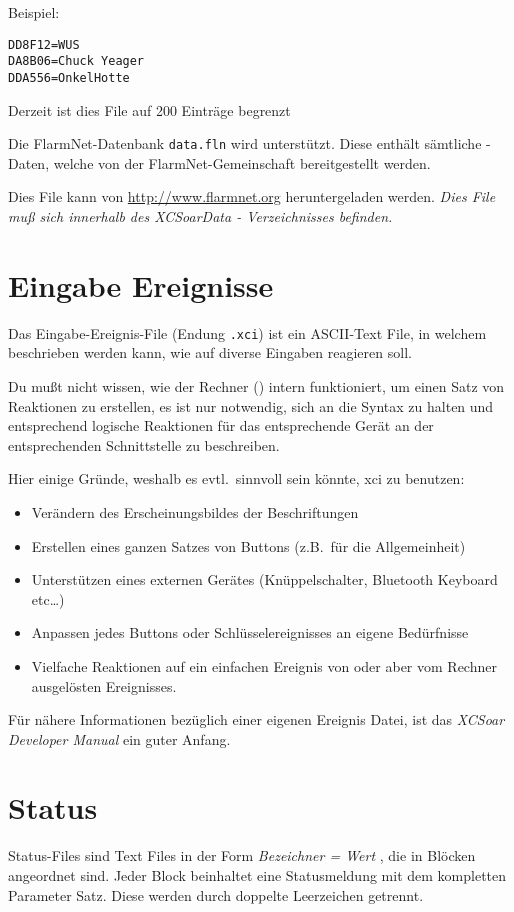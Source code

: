 Beispiel:
\begin{verbatim}
DD8F12=WUS
DA8B06=Chuck Yeager
DDA556=OnkelHotte
\end{verbatim}

Derzeit ist dies File auf 200 Einträge begrenzt

Die  FlarmNet-Datenbank \verb|data.fln| wird unterstützt.
Diese enthält sämtliche \fl-Daten, welche von der \textsf{\textsf{FlarmNet}}-Gemeinschaft bereitgestellt werden.

Dies File kann von  \url{http://www.flarmnet.org}  heruntergeladen werden.
\textsl{Dies File muß sich innerhalb des XCSoarData - Verzeichnisses befinden.}


\section{Eingabe Ereignisse}

Das Eingabe-Ereignis-File  (Endung \verb|.xci|) ist ein ASCII-Text File,
in welchem beschrieben werden kann, wie  \xc auf diverse Eingaben reagieren soll.

Du mußt nicht wissen, wie der Rechner (\xc) intern funktioniert, um einen Satz von
Reaktionen zu erstellen, es ist nur notwendig, sich an die Syntax zu halten und entsprechend logische
Reaktionen für das entsprechende Gerät an der entsprechenden Schnittstelle zu beschreiben.

Hier einige Gründe, weshalb es evtl.\ sinnvoll sein könnte, \textsf{xci} zu benutzen:
\begin{itemize}
\item Verändern des Erscheinungsbildes der   Beschriftungen
\item Erstellen eines ganzen Satzes von Buttons (z.B.\ für die Allgemeinheit)
\item Unterstützen eines externen Gerätes (Knüppelschalter, Bluetooth Keyboard etc\dots)
\item Anpassen jedes Buttons oder Schlüsselereignisses an eigene Bedürfnisse
\item Vielfache Reaktionen auf ein einfachen Ereignis von  \xc oder aber vom Rechner
ausgelösten Ereignisses.
\end{itemize}
Für nähere Informationen bezüglich einer eigenen Ereignis Datei, ist das 
{\em XCSoar Developer Manual} ein guter Anfang.


\section{Status}\label{sec:status}
Status-Files sind Text Files in der Form  {\em Bezeichner  = Wert },
die in Blöcken  angeordnet sind. Jeder Block beinhaltet eine Statusmeldung
mit dem kompletten Parameter Satz.
Diese werden durch doppelte Leerzeichen getrennt.

